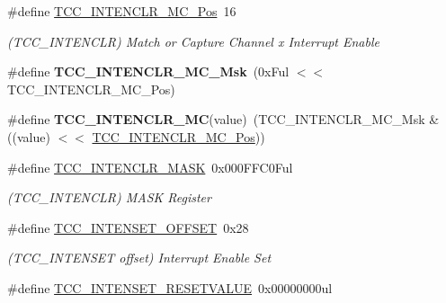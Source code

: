 \begin{DoxyCompactItemize}
\item 
\hypertarget{group___s_a_m_l21___t_c_c_ga4465de034c5ba76405e593d37891a313}{}\#define \hyperlink{group___s_a_m_l21___t_c_c_ga4465de034c5ba76405e593d37891a313}{T\+C\+C\+\_\+\+I\+N\+T\+E\+N\+C\+L\+R\+\_\+\+M\+C\+\_\+\+Pos}~16\label{group___s_a_m_l21___t_c_c_ga4465de034c5ba76405e593d37891a313}

\begin{DoxyCompactList}\small\item\em (T\+C\+C\+\_\+\+I\+N\+T\+E\+N\+C\+L\+R) Match or Capture Channel x Interrupt Enable \end{DoxyCompactList}\item 
\hypertarget{group___s_a_m_l21___t_c_c_ga5fc1a1e37328ca5cb362a669dd90bd79}{}\#define {\bfseries T\+C\+C\+\_\+\+I\+N\+T\+E\+N\+C\+L\+R\+\_\+\+M\+C\+\_\+\+Msk}~(0x\+Ful $<$$<$ T\+C\+C\+\_\+\+I\+N\+T\+E\+N\+C\+L\+R\+\_\+\+M\+C\+\_\+\+Pos)\label{group___s_a_m_l21___t_c_c_ga5fc1a1e37328ca5cb362a669dd90bd79}

\item 
\hypertarget{group___s_a_m_l21___t_c_c_gad6e689cd68e549eb5d643d6f065a86aa}{}\#define {\bfseries T\+C\+C\+\_\+\+I\+N\+T\+E\+N\+C\+L\+R\+\_\+\+M\+C}(value)~(T\+C\+C\+\_\+\+I\+N\+T\+E\+N\+C\+L\+R\+\_\+\+M\+C\+\_\+\+Msk \& ((value) $<$$<$ \hyperlink{group___s_a_m_l21___t_c_c_ga4465de034c5ba76405e593d37891a313}{T\+C\+C\+\_\+\+I\+N\+T\+E\+N\+C\+L\+R\+\_\+\+M\+C\+\_\+\+Pos}))\label{group___s_a_m_l21___t_c_c_gad6e689cd68e549eb5d643d6f065a86aa}

\item 
\hypertarget{group___s_a_m_l21___t_c_c_gaa6395f7b4e6bc568fca5d6feea1d86d5}{}\#define \hyperlink{group___s_a_m_l21___t_c_c_gaa6395f7b4e6bc568fca5d6feea1d86d5}{T\+C\+C\+\_\+\+I\+N\+T\+E\+N\+C\+L\+R\+\_\+\+M\+A\+S\+K}~0x000\+F\+F\+C0\+Ful\label{group___s_a_m_l21___t_c_c_gaa6395f7b4e6bc568fca5d6feea1d86d5}

\begin{DoxyCompactList}\small\item\em (T\+C\+C\+\_\+\+I\+N\+T\+E\+N\+C\+L\+R) M\+A\+S\+K Register \end{DoxyCompactList}\item 
\hypertarget{group___s_a_m_l21___t_c_c_ga82bb3056fd12e972923a61fa8c843da9}{}\#define \hyperlink{group___s_a_m_l21___t_c_c_ga82bb3056fd12e972923a61fa8c843da9}{T\+C\+C\+\_\+\+I\+N\+T\+E\+N\+S\+E\+T\+\_\+\+O\+F\+F\+S\+E\+T}~0x28\label{group___s_a_m_l21___t_c_c_ga82bb3056fd12e972923a61fa8c843da9}

\begin{DoxyCompactList}\small\item\em (T\+C\+C\+\_\+\+I\+N\+T\+E\+N\+S\+E\+T offset) Interrupt Enable Set \end{DoxyCompactList}\item 
\hypertarget{group___s_a_m_l21___t_c_c_ga54ad13243dec9ec2cc0375a2996c30b6}{}\#define \hyperlink{group___s_a_m_l21___t_c_c_ga54ad13243dec9ec2cc0375a2996c30b6}{T\+C\+C\+\_\+\+I\+N\+T\+E\+N\+S\+E\+T\+\_\+\+R\+E\+S\+E\+T\+V\+A\+L\+U\+E}~0x00000000ul\label{group___s_a_m_l21___t_c_c_ga54ad13243dec9ec2cc0375a2996c30b6}


\end{DoxyCompactItemize}
